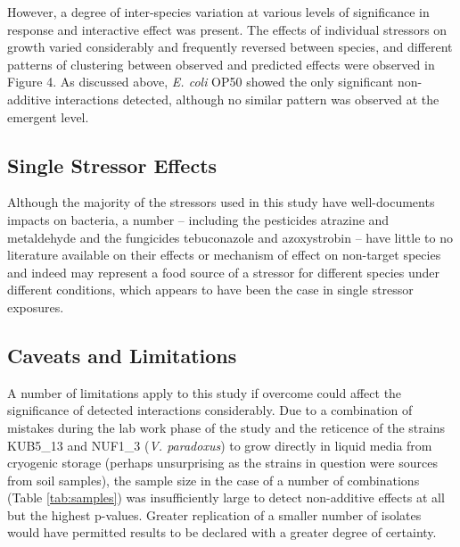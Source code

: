 \documentclass[final,1p,times]{elsarticle}
\begin{document}
However, a degree of inter-species variation at various levels of significance in response and interactive effect was present. The effects of individual stressors on growth varied considerably and frequently reversed between species, and different patterns of clustering between observed and predicted effects were observed in Figure 4. As discussed above, \textit{E. coli} OP50 showed the only significant non-additive interactions detected, although no similar pattern was observed at the emergent level. 

\subsection{Single Stressor Effects}
\label{S:4:2}

Although the majority of the stressors used in this study have well-documents impacts on bacteria, a number – including the pesticides atrazine and metaldehyde and the fungicides tebuconazole and azoxystrobin – have little to no literature available on their effects or mechanism of effect on non-target species and indeed may represent a food source of a stressor for different species under different conditions, which appears to have been the case in single stressor exposures.

\subsection{Caveats and Limitations}
\label{S:4:3}

A number of limitations apply to this study if overcome could affect the significance of detected interactions considerably.  Due to a combination of mistakes during the lab work phase of the study and the reticence of the strains KUB5\_13 and NUF1\_3 (\textit{V. paradoxus}) to grow directly in liquid media from cryogenic storage (perhaps unsurprising as the strains in question were sources from soil samples), the sample size in the case of a number of combinations (Table \ref{tab:samples}) was insufficiently large to detect non-additive effects at all but the highest p-values.  Greater replication of a smaller number of isolates would have permitted results to be declared with a greater degree of certainty. 
\end{document}
